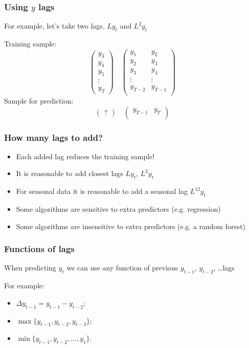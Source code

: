 \begin{frame}
	\frametitle{Using $y$ lags}
	
	For example, let's take two lags, $Ly_t$ and $L^2 y_t$
	\pause
	
	\alert{Training} sample:
	\[
	\begin{pmatrix}
		y_3 \\
		y_4 \\
		y_5 \\
		\vdots \\
		y_T
	\end{pmatrix} \quad
	\begin{pmatrix}
		y_1 & y_2 \\
		y_2 & y_3 \\
		y_3 & y_4 \\
		\vdots & \vdots \\
		y_{T-2} & y_{T-1} \\
	\end{pmatrix}
	\]
	\pause
	Sample for \alert{prediction}:
	\[
	\begin{pmatrix}
		?
	\end{pmatrix} \quad
	\begin{pmatrix}
		y_{T-1} & y_{T} \\
	\end{pmatrix}
	\]
	
\end{frame}

\begin{frame}
	\frametitle{How many lags to add?}
	
	\begin{itemize}[<+->]
		\item Each added lag \alert{reduces} the training sample!
		\item It is reasonable to add \alert{closest lags} $Ly_t$, $L^2y_t$
		\item For seasonal data it is reasonable to add a \alert{seasonal lag} $L^{12} y_t$
		\item Some algorithms   are  \alert{sensitive to extra predictors} (e.g. regression)
		\item Some algorithms  are \alert{insensitive to extra predictors} (e.g. a random forest)
	\end{itemize}
\end{frame}

\begin{frame}
	\frametitle{Functions of lags}
	When predicting $y_{t}$ we can use any function of \alert{previous} $y_{t-1}$, $y_{t-2}$, \ldots lags
	
	\pause
	
	For example:
	\begin{itemize}[<+->]
		\item $\Delta y_{t-1} = y_{t-1} - y_{t-2}$;
		\item $\max\{ y_{t-1}, y_{t-2}, y_{t-3} \}$;
		\item $\min\{ y_{t-1}, y_{t-2}, \ldots, y_1\}$.
	\end{itemize}
\end{frame}

